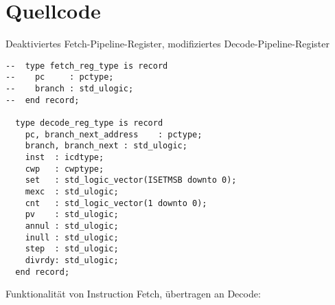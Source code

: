 \chapter{Quellcode}


Deaktiviertes Fetch-Pipeline-Register, modifiziertes Decode-Pipeline-Register

\begin{lstlisting}
--  type fetch_reg_type is record
--    pc     : pctype;
--    branch : std_ulogic;
--  end record;
  
  type decode_reg_type is record
    pc, branch_next_address    : pctype;
    branch, branch_next : std_ulogic;
    inst  : icdtype;
    cwp   : cwptype;
    set   : std_logic_vector(ISETMSB downto 0);
    mexc  : std_ulogic;
    cnt   : std_logic_vector(1 downto 0);
    pv    : std_ulogic;
    annul : std_ulogic;
    inull : std_ulogic;
    step  : std_ulogic;        
    divrdy: std_ulogic;        
  end record;
\end{lstlisting}

Funktionalität von Instruction Fetch, übertragen an Decode:

